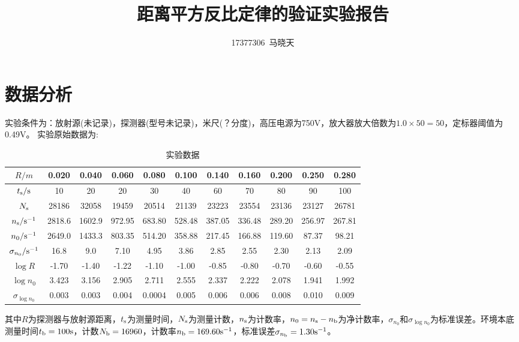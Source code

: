 \documentclass[UTF8]{ctexart}
\title{距离平方反比定律的验证实验报告}
\author{17377306\ 马晓天}
\begin{document}
\maketitle

\thispagestyle{empty}
\section{数据分析}
实验条件为：放射源(未记录)，探测器(型号未记录)，米尺(？分度)，高压电源为750V，放大器放大倍数为$1.0\times50=50 $，定标器阈值为0.49V。
实验原始数据为:
\begin{table}[H]
	\centering
	\caption{实验数据}
	\begin{tabular}{ccccccccccc}
		\hline
		$ R/m$ & 0.020 & 0.040 & 0.060 & 0.080 & 0.100 & 0.140 & 0.160 & 0.200 & 0.250 & 0.280\\
		\hline
		$ t_{\rm s}/\rm s$ & 10 & 20 & 20 & 30 & 40 & 60 & 70 & 80 & 90 & 100\\
		$ N_{\rm s}$ & 28186 & 32058 & 19459 & 20514 & 21139 & 23223 & 23554 & 23136 & 23127 & 26781\\
		$ n_{\rm s}/\rm s^{-1}$ & 2818.6 & 1602.9 & 972.95 & 683.80 & 528.48 & 387.05 & 336.48 & 289.20 & 256.97 & 267.81\\
		$ n_0/\rm s^{-1}$ & 2649.0 & 1433.3 & 803.35 & 514.20 & 358.88 & 217.45 & 166.88 & 119.60 & 87.37 & 98.21\\
		$ \sigma_{n_0}/\rm s^{-1} $ &16.8&9.0&7.10&4.95&3.86&2.85&2.55&2.30&2.13&2.09\\
		$ \log R$ & -1.70 & -1.40 & -1.22 & -1.10 & -1.00 & -0.85 & -0.80 & -0.70 & -0.60 & -0.55\\
		$ \log n_0$ & 3.423 & 3.156 & 2.905 & 2.711 & 2.555 & 2.337 & 2.222 & 2.078 & 1.941 & 1.992\\
		$ \sigma_{\log n_0} $ &0.003&0.003&0.004&0.0004&0.005&0.006&0.006&0.008&0.010&0.009\\
		\hline
	\end{tabular}
\end{table}
其中$ R $为探测器与放射源距离，$t_{\rm s}$为测量时间，$N_{\rm s}$为测量计数，$n_{\rm s}$为计数率，$ n_0=n_{\mathrm{s}}-n_{\rm b} $为净计数率，$ \sigma_{n_{0}} $和$ \sigma_{\log n_{0}} $为标准误差。环境本底测量时间$ t_{\rm b}=100\rm s $，计数$ N_{\rm b}=16960 $，计数率$ n_{\rm b}=169.60\rm s^{-1} $，标准误差$ \sigma_{n_{\rm b}}=1.30\rm s^{-1}$。
\end{document}
